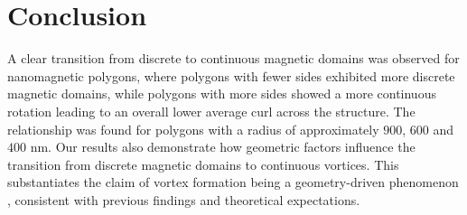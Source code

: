 \section{Conclusion}

A clear transition from discrete to continuous magnetic domains was observed for nanomagnetic polygons, where polygons with fewer sides exhibited more discrete magnetic domains, while polygons with more sides showed a more continuous rotation %
leading to an overall lower average curl across the structure. The relationship was found for polygons with a radius of approximately $900$, $600$ and $400$ nm. Our results also demonstrate how geometric factors influence the transition from discrete magnetic domains to continuous vortices. This substantiates the claim of vortex formation being a geometry-driven phenomenon \cite{behncke2018_magnetic_vortices}, consistent with previous findings and theoretical expectations.